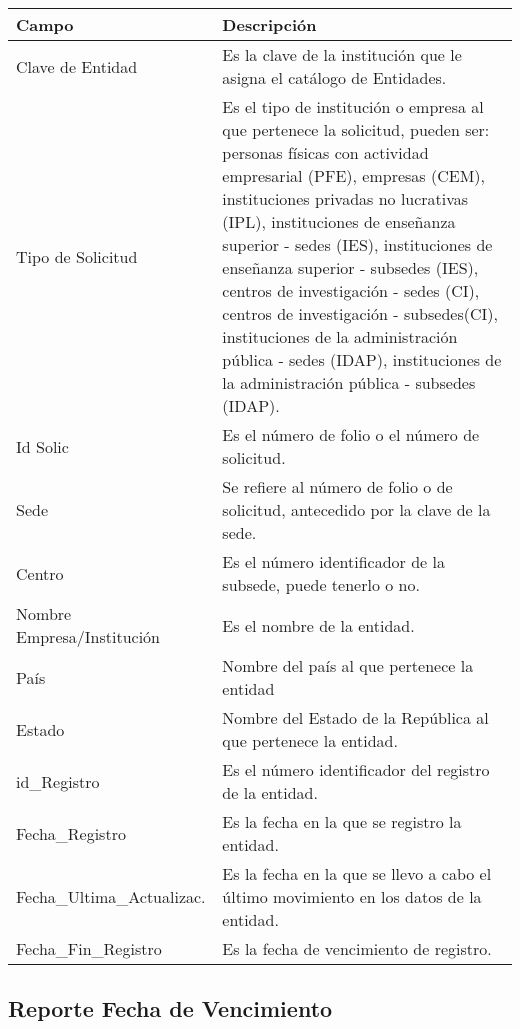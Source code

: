 \begin{tabular}{ m{} m{}  }%
	\rowcolor{gray1} {\bf Campo} &  {\bf Descripción} \\ \hline \hline

	Clave de Entidad & Es la clave de la institución que le asigna el catálogo de Entidades.\\
	\rowcolor{gray1}Tipo de Solicitud & Es el tipo de institución o empresa al que pertenece la solicitud, pueden ser: personas físicas con actividad empresarial (PFE), empresas (CEM), instituciones privadas no lucrativas (IPL), instituciones de enseñanza superior - sedes (IES), instituciones de enseñanza superior - subsedes (IES), centros de investigación - sedes (CI), centros de investigación - subsedes(CI), instituciones de la administración pública - sedes (IDAP), instituciones de la administración pública - subsedes (IDAP).\\
	Id Solic & Es el número de folio o el número de solicitud.\\
	\rowcolor{gray1}Sede & Se refiere al número de folio o de solicitud, antecedido por la clave de la sede.\\
	Centro & Es el número identificador de la subsede, puede tenerlo o no.\\
	\rowcolor{gray1}Nombre Empresa/Institución & Es el nombre de la entidad.\\
	País & Nombre del país al que pertenece la entidad\\
	\rowcolor{gray1}Estado & Nombre del Estado de la República al que pertenece la entidad.\\
	id\_Registro & Es el número identificador del registro de la entidad.\\
	\rowcolor{gray1}Fecha\_Registro & Es la fecha en la que se registro la entidad.\\
	Fecha\_Ultima\_Actualizac. & Es la fecha en la que se llevo a cabo el último movimiento en los datos de la entidad.\\
	\rowcolor{gray1}Fecha\_Fin\_Registro & Es la fecha de vencimiento de registro.\\
\end{tabular}

\subsection{Reporte Fecha de Vencimiento}
\label{appendix:Reportes:PeopleSoft:}

